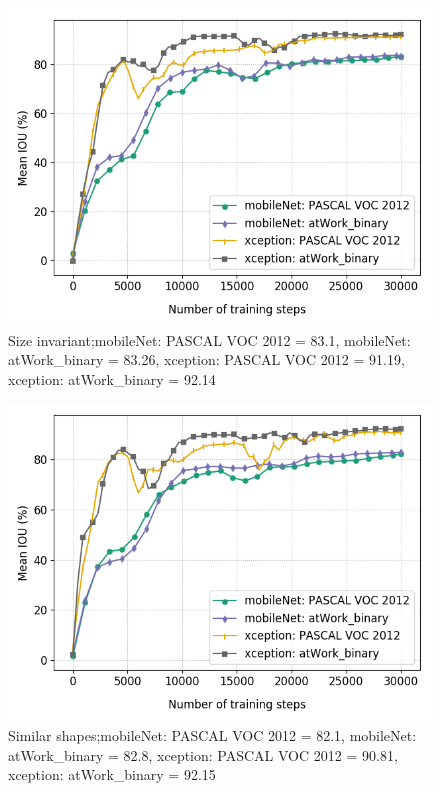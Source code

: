 \begin{figure}[htb!]
	\includegraphics[scale=0.4]{images/transfer_size}
	\caption{Size invariant;mobileNet: PASCAL VOC 2012 = 83.1, mobileNet: atWork\_binary = 83.26, xception: PASCAL VOC 2012 = 91.19, xception: atWork\_binary = 92.14}
\end{figure}

\begin{figure}[htb!]
	\includegraphics[scale=0.4]{images/transfer_shape}
	\caption{Similar shapes;mobileNet: PASCAL VOC 2012 = 82.1, mobileNet: atWork\_binary = 82.8, xception: PASCAL VOC 2012 = 90.81, xception: atWork\_binary = 92.15}
\end{figure}

